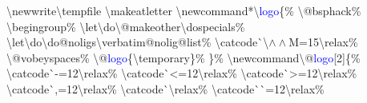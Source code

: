 \resetlinenumber
\begin{linenumbers}\linespread{1}\ttfamily
\textbackslash newwrite\textbackslash tempf{}ile\newline
\textbackslash makeatletter\newline
\textbackslash newcommand*\textbackslash \textcolor{blue}{logo}\{\%\newline
\hspace*{1.2em}\textbackslash @bsphack\%\newline
\hspace*{1.2em}\textbackslash begingroup\%\newline
\hspace*{1.2em}\textbackslash let\textbackslash do\textbackslash @makeother\textbackslash dospecials\%\newline
\hspace*{1.2em}\textbackslash let\textbackslash do\textbackslash do@noligs\textbackslash verbatim@nolig@list\%\newline
\hspace*{1.2em}\textbackslash catcode\`{}\textbackslash $\wedge\wedge$M=15\textbackslash relax\%\newline
\hspace*{1.2em}\textbackslash @vobeyspaces\%\newline
\hspace*{1.2em}\textbackslash @\textcolor{blue}{logo}\{\textbackslash temporary\}\%\newline
\}\%\newline
\textbackslash newcommand\textbackslash @\textcolor{blue}{logo}[2]\{\%\newline
\hspace*{1.2em}\textbackslash catcode\`{}-=12\textbackslash relax\%\newline
\hspace*{1.2em}\textbackslash catcode\`{}<=12\textbackslash relax\%\newline
\hspace*{1.2em}\textbackslash catcode\`{}>=12\textbackslash relax\%\newline
\hspace*{1.2em}\textbackslash catcode\`{},=12\textbackslash relax\%\newline
\hspace*{1.2em}\textbackslash catcode\`{}\textbackslash relax\%\newline
\hspace*{1.2em}\textbackslash catcode\`{}\`{}=12\textbackslash relax\%\newline

\end{linenumbers}
